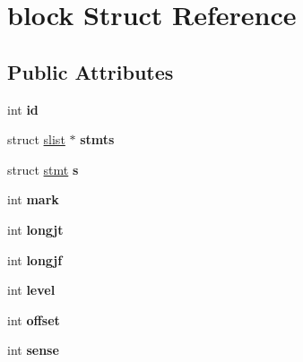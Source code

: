 \hypertarget{structblock}{
\section{block Struct Reference}
\label{structblock}
}
\subsection*{Public Attributes}
\begin{DoxyCompactItemize}
\item 
\hypertarget{structblock_ac706f65a533113e9522252f2fbb41582}{
int {\bfseries id}}
\label{structblock_ac706f65a533113e9522252f2fbb41582}

\item 
\hypertarget{structblock_a4992bec5879c1a65bb6afb67875e6340}{
struct \hyperlink{structslist}{slist} $\ast$ {\bfseries stmts}}
\label{structblock_a4992bec5879c1a65bb6afb67875e6340}

\item 
\hypertarget{structblock_ad8f1bd7e04203d4ddcb357e3e32faaf2}{
struct \hyperlink{structstmt}{stmt} {\bfseries s}}
\label{structblock_ad8f1bd7e04203d4ddcb357e3e32faaf2}

\item 
\hypertarget{structblock_a92ab285ab562f6a596f2023b1a1c3a9e}{
int {\bfseries mark}}
\label{structblock_a92ab285ab562f6a596f2023b1a1c3a9e}

\item 
\hypertarget{structblock_af6e7fba7ccece23c1ab627cb97df984c}{
int {\bfseries longjt}}
\label{structblock_af6e7fba7ccece23c1ab627cb97df984c}

\item 
\hypertarget{structblock_aaf46571c1adfd2b21d18d3fb72a6a43f}{
int {\bfseries longjf}}
\label{structblock_aaf46571c1adfd2b21d18d3fb72a6a43f}

\item 
\hypertarget{structblock_ae5f7bf200a5356c52d477feaf0745f7f}{
int {\bfseries level}}
\label{structblock_ae5f7bf200a5356c52d477feaf0745f7f}

\item 
\hypertarget{structblock_a2d1f66b7099a0a6a40bc4e31e6f8d4e8}{
int {\bfseries offset}}
\label{structblock_a2d1f66b7099a0a6a40bc4e31e6f8d4e8}

\item 
\hypertarget{structblock_a2dda9fd56d32a9a8582f88a6393d472a}{
int {\bfseries sense}}
\label{structblock_a2dda9fd56d32a9a8582f88a6393d472a}


\end{DoxyCompactItemize}
